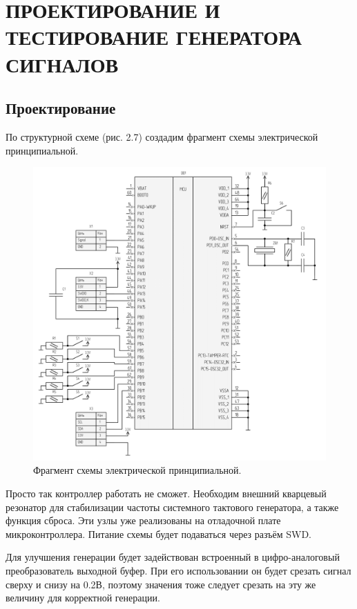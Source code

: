 \chapter{ПРОЕКТИРОВАНИЕ И ТЕСТИРОВАНИЕ ГЕНЕРАТОРА СИГНАЛОВ}
\section{Проектирование}
	По структурной схеме (рис. 2.7) создадим фрагмент схемы электрической принципиальной. 
	
	\begin{figure}[H]
    \centering
    \includegraphics[width=1\textwidth]{../image/scheme-cropped.png}
    \caption{Фрагмент схемы электрической принципиальной.}
	\end{figure}
	
	Просто так контроллер работать не сможет. Необходим внешний кварцевый резонатор для стабилизации частоты системного тактового генератора, а также функция сброса. Эти узлы уже реализованы на отладочной плате микроконтроллера. Питание схемы будет подаваться через разъём SWD.
		
	Для улучшения генерации будет задействован встроенный в цифро-аналоговый преобразователь выходной буфер. При его использовании он будет срезать сигнал сверху и снизу на 0.2В, поэтому значения тоже следует срезать на эту же величину для корректной генерации.
	
